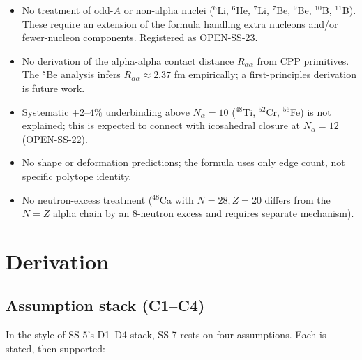 \documentclass[11pt,letterpaper]{article}
\newcommand{\Nalpha}{N_{\alpha}}
\newcommand{\Raa}{R_{\alpha\alpha}}
\begin{document}
\begin{itemize}
\item No treatment of odd-$A$ or non-alpha nuclei (${}^6$Li, ${}^6$He, ${}^7$Li, ${}^7$Be, ${}^9$Be, ${}^{10}$B, ${}^{11}$B). These require an extension of the formula handling extra nucleons and/or fewer-nucleon components. Registered as OPEN-SS-23.
\item No derivation of the alpha-alpha contact distance $\Raa$ from CPP primitives. The ${}^8$Be analysis infers $\Raa \approx 2.37$ fm empirically; a first-principles derivation is future work.
\item Systematic $+2$--$4\%$ underbinding above $\Nalpha = 10$ (${}^{48}$Ti, ${}^{52}$Cr, ${}^{56}$Fe) is not explained; this is expected to connect with icosahedral closure at $\Nalpha = 12$ (OPEN-SS-22).
\item No shape or deformation predictions; the formula uses only edge count, not specific polytope identity.
\item No neutron-excess treatment (${}^{48}$Ca with $N = 28, Z = 20$ differs from the $N = Z$ alpha chain by an 8-neutron excess and requires separate mechanism).
\end{itemize}

\section{Derivation}
\label{sec:derivation}

\subsection{Assumption stack (C1--C4)}
\label{sec:assumptions}

In the style of SS-5's D1--D4 stack, SS-7 rests on four assumptions. Each is stated, then supported:
\end{document}
